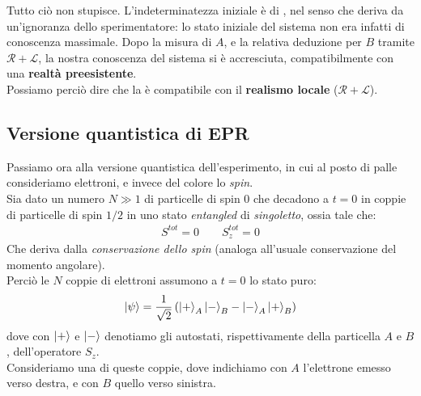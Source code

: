 \documentclass[../../FisicaTeorica.tex]{subfiles}
\begin{document}
Tutto ciò non stupisce. L'indeterminatezza iniziale è di , nel senso che deriva da un'ignoranza dello sperimentatore: lo stato iniziale del sistema non era infatti di conoscenza massimale. Dopo la misura di $A$, e la relativa deduzione per $B$ tramite $\mathcal{R}+\mathcal{L}$, la nostra conoscenza del sistema si è accresciuta, compatibilmente con una \textbf{realtà preesistente}.\\
Possiamo perciò dire che la \MC è compatibile con il \textbf{realismo locale} ($\mathcal{R}+\mathcal{L}$). 

\subsection{Versione quantistica di EPR}
Passiamo ora alla versione quantistica dell'esperimento, in cui al posto di palle consideriamo elettroni, e invece del colore lo \textit{spin}.\\
Sia dato un numero $N\gg1$ di particelle di spin $0$ che decadono a $t=0$ in coppie di particelle di spin $1/2$  in uno stato \textit{entangled} di \textit{singoletto}, ossia tale che:
\begin{align*}
S^{tot}=0\qquad S_z^{tot}=0
\end{align*}
Che deriva dalla \textit{conservazione dello spin} (analoga all'usuale conservazione del momento angolare).\\
Perciò le $N$ coppie di elettroni assumono a $t=0$ lo stato puro:
\begin{align*}
\Ket{\psi}=\frac{1}{\sqrt{2}}\left(\Ket{+}_A\Ket{-}_B - \Ket{-}_A\Ket{+}_B\right)
\end{align*}
dove con $\Ket{+}$ e $\Ket{-}$ denotiamo gli autostati, rispettivamente della particella $A$ e $B$, dell'operatore $S_z$.\\
Consideriamo una di queste coppie, dove indichiamo con $A$ l'elettrone emesso verso destra, e con $B$ quello verso sinistra.\\
\end{document}
